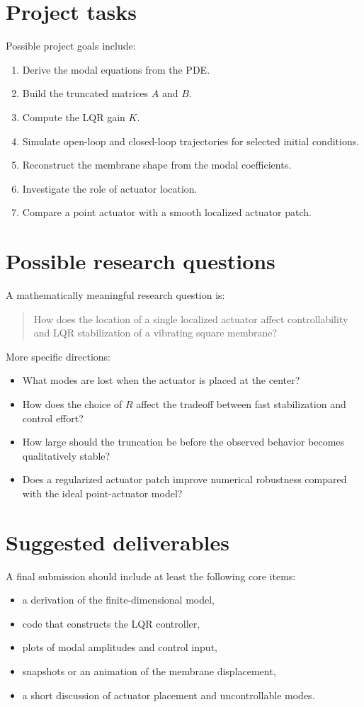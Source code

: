 \documentclass[11pt]{article}
\begin{document}
\section{Project tasks}
Possible project goals include:
\begin{enumerate}[leftmargin=1.5em]
\item Derive the modal equations from the PDE.
\item Build the truncated matrices $A$ and $B$.
\item Compute the LQR gain $K$.
\item Simulate open-loop and closed-loop trajectories for selected 
initial conditions.
\item Reconstruct the membrane shape from the modal coefficients.
\item Investigate the role of actuator location.
\item Compare a point actuator with a smooth localized actuator 
patch.
\end{enumerate}

\section{Possible research questions}
A mathematically meaningful research question is:
\begin{quote}
How does the location of a single localized actuator affect 
controllability and LQR stabilization of a vibrating square membrane?
\end{quote}
More specific directions:
\begin{itemize}[leftmargin=1.5em]
\item What modes are lost when the actuator is placed at the center?
\item How does the choice of $R$ affect the tradeoff between fast 
stabilization and control effort?
\item How large should the truncation be before the observed behavior 
becomes qualitatively stable?
\item Does a regularized actuator patch improve numerical robustness 
compared with the ideal point-actuator model?
\end{itemize}

\section{Suggested deliverables}
A final submission should include at least the following core items:
\begin{itemize}[leftmargin=1.5em]
\item a derivation of the finite-dimensional model,
\item code that constructs the LQR controller,
\item plots of modal amplitudes and control input,
\item snapshots or an animation of the membrane displacement,
\item a short discussion of actuator placement and uncontrollable modes.
\end{itemize}
\end{document}
